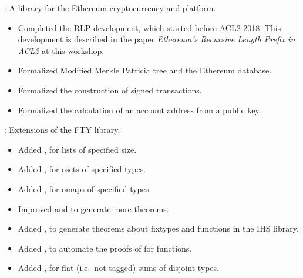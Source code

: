 \begin{frame}

\implibtitle

:
A library for the Ethereum cryptocurrency and platform.
\begin{itemize}
\item
Completed the RLP development, which started before ACL2-2018.
This development is described in the paper
\textit{Ethereum's Recursive Length Prefix in ACL2} at this workshop.
\item
Formalized Modified Merkle Patricia tree and the Ethereum database.
\item
Formalized the construction of signed transactions.
\item
Formalized the calculation of an account address from a public key.
\end{itemize}

\end{frame}


\begin{frame}

\implibtitle

:
Extensions of the FTY library.
\begin{itemize}
\item
Added , for lists of specified size.
\item
Added , for osets of specified types.
\item
Added , for omaps of specified types.
\item
Improved  and  to generate more theorems.
\item
Added ,
to generate theorems about  fixtypes
and functions in the IHS library.
\item
Added ,
to automate the proofs of  for  functions.
\item
Added ,
for flat (i.e.\ not tagged) sums of disjoint types.
\end{itemize}

\end{frame}


